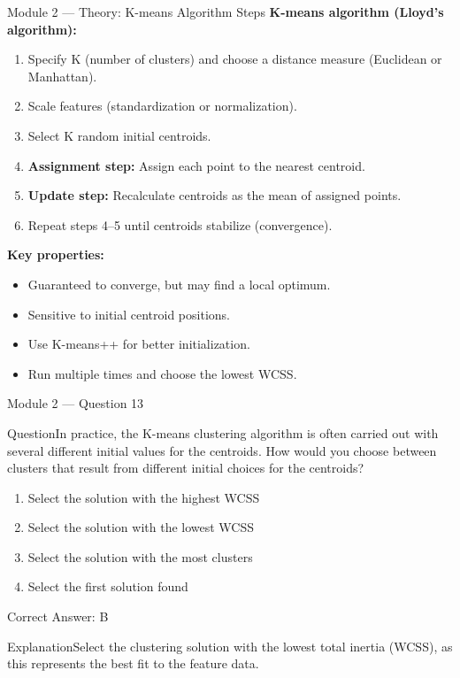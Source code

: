 \documentclass[aspectratio=169,10pt]{beamer}
\newcommand{\question}[1]{\begin{block}{Question}#1\end{block}}
\newcommand{\options}[4]{%
	\begin{enumerate}[label=\Alph*.,leftmargin=*]
		\item #1
		\item #2
		\item #3
		\item #4
	\end{enumerate}
}
\newcommand{\answerbox}[1]{\begin{exampleblock}{Correct Answer: #1}\end{exampleblock}}
\newcommand{\explain}[1]{\begin{block}{Explanation}#1\end{block}}
\begin{document}
\begin{frame}{Module 2 --- Theory: K-means Algorithm Steps}
	\small
	\textbf{K-means algorithm (Lloyd's algorithm):}
	\begin{enumerate}
		\item Specify K (number of clusters) and choose a distance measure (Euclidean or Manhattan).
		\item Scale features (standardization or normalization).
		\item Select K random initial centroids.
		\item \textbf{Assignment step:} Assign each point to the nearest centroid.
		\item \textbf{Update step:} Recalculate centroids as the mean of assigned points.
		\item Repeat steps 4--5 until centroids stabilize (convergence).
	\end{enumerate}
	
	\vspace{0.2cm}
	\textbf{Key properties:}
	\begin{itemize}
		\item Guaranteed to converge, but may find a local optimum.
		\item Sensitive to initial centroid positions.
		\item Use K-means++ for better initialization.
		\item Run multiple times and choose the lowest WCSS.
	\end{itemize}
\end{frame}


	\begin{frame}{Module 2 --- Question 13}
		\question{In practice, the K-means clustering algorithm is often carried out with several different initial values for the centroids. How would you choose between clusters that result from different initial choices for the centroids?}
		\options{Select the solution with the highest WCSS}{Select the solution with the lowest WCSS}{Select the solution with the most clusters}{Select the first solution found}
		\answerbox{B}
		\explain{Select the clustering solution with the lowest total inertia (WCSS), as this represents the best fit to the feature data.}
	\end{frame}
	
\end{document}
